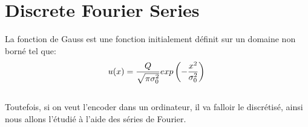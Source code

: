 \documentclass{article}
\begin{document}
\section{Discrete Fourier Series}
La fonction de Gauss est une fonction initialement définit sur un domaine non borné tel que:\\
\begin{equation}
    u(x) = \frac{Q}{\sqrt{\pi \sigma^2_0}} exp\left( -\frac{x^2}{\sigma^2_0} \right )\\
\end{equation} \\
Toutefois, si on veut l'encoder dans un ordinateur, il va falloir le discrétisé, ainsi nous allons l'étudié à l'aide des séries de Fourier.\\
\begin{figure}[H]
    \centering

\end{figure}
\end{document}
